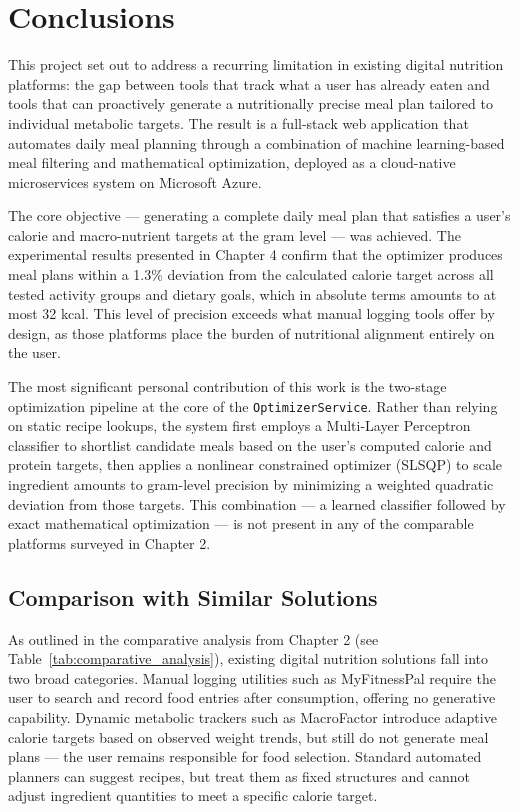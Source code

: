 \chapter{Conclusions}
\label{cap:cap5}

This project set out to address a recurring limitation in existing digital nutrition
platforms: the gap between tools that track what a user has already eaten and tools
that can proactively generate a nutritionally precise meal plan tailored to individual
metabolic targets. The result is a full-stack web application that automates daily
meal planning through a combination of machine learning-based meal filtering and
mathematical optimization, deployed as a cloud-native microservices system on
Microsoft Azure.

The core objective — generating a complete daily meal plan that satisfies a user's
calorie and macro-nutrient targets at the gram level — was achieved. The experimental
results presented in Chapter 4 confirm that the optimizer produces meal plans within
a 1.3\% deviation from the calculated calorie target across all tested activity groups
and dietary goals, which in absolute terms amounts to at most 32 kcal. This level of
precision exceeds what manual logging tools offer by design, as those platforms place
the burden of nutritional alignment entirely on the user.

The most significant personal contribution of this work is the two-stage optimization
pipeline at the core of the \texttt{OptimizerService}. Rather than relying on static
recipe lookups, the system first employs a Multi-Layer Perceptron classifier to
shortlist candidate meals based on the user's computed calorie and protein targets,
then applies a nonlinear constrained optimizer (SLSQP) to scale ingredient amounts
to gram-level precision by minimizing a weighted quadratic deviation from those targets. This combination — a learned classifier
followed by exact mathematical optimization — is not present in any of the comparable
platforms surveyed in Chapter 2.

\section{Comparison with Similar Solutions}

As outlined in the comparative analysis from Chapter 2 (see
Table~\ref{tab:comparative_analysis}), existing digital nutrition solutions fall into
two broad categories. Manual logging utilities such as MyFitnessPal require the user
to search and record food entries after consumption, offering no generative capability.
Dynamic metabolic trackers such as MacroFactor introduce adaptive calorie targets based
on observed weight trends, but still do not generate meal plans — the user remains
responsible for food selection. Standard automated planners can suggest recipes, but
treat them as fixed structures and cannot adjust ingredient quantities to meet a
specific calorie target.

